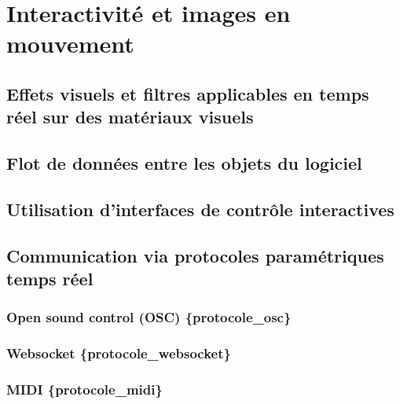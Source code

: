 \documentclass[
]{book}
\begin{document}
\hypertarget{interagir}{%
\chapter{Interactivité et images en mouvement}\label{interagir}}

\hypertarget{effets-visuels-et-filtres-applicables-en-temps-ruxe9el-sur-des-matuxe9riaux-visuels}{%
\section{Effets visuels et filtres applicables en temps réel sur des matériaux visuels}\label{effets-visuels-et-filtres-applicables-en-temps-ruxe9el-sur-des-matuxe9riaux-visuels}}

\hypertarget{flot-de-donnuxe9es-entre-les-objets-du-logiciel}{%
\section{Flot de données entre les objets du logiciel}\label{flot-de-donnuxe9es-entre-les-objets-du-logiciel}}

\hypertarget{interagir_interfaces}{%
\section{Utilisation d'interfaces de contrôle interactives}\label{interagir_interfaces}}

\hypertarget{interagir_protocoles}{%
\section{Communication via protocoles paramétriques temps réel}\label{interagir_protocoles}}

\hypertarget{open-sound-control-osc-protocole_osc}{%
\subsection{Open sound control (OSC) \{protocole\_osc\}}\label{open-sound-control-osc-protocole_osc}}

\hypertarget{websocket-protocole_websocket}{%
\subsection{Websocket \{protocole\_websocket\}}\label{websocket-protocole_websocket}}

\hypertarget{midi-protocole_midi}{%
\subsection{MIDI \{protocole\_midi\}}\label{midi-protocole_midi}}
\end{document}
